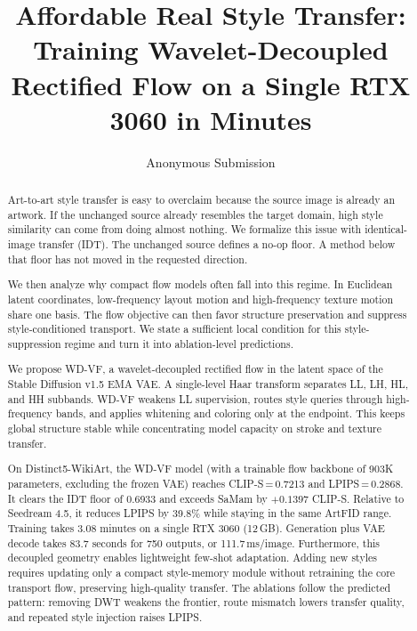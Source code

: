 \documentclass[letterpaper]{article}
\title{Affordable Real Style Transfer:\\Training Wavelet-Decoupled Rectified Flow on a Single RTX 3060 in Minutes}
\author{Anonymous Submission}
\begin{document}
\maketitle

\begin{abstract}
Art-to-art style transfer is easy to overclaim because the source image is already an artwork.
If the unchanged source already resembles the target domain, high style similarity can come from doing almost nothing.
We formalize this issue with identical-image transfer (IDT).
The unchanged source defines a no-op floor.
A method below that floor has not moved in the requested direction.

We then analyze why compact flow models often fall into this regime.
In Euclidean latent coordinates, low-frequency layout motion and high-frequency texture motion share one basis.
The flow objective can then favor structure preservation and suppress style-conditioned transport.
We state a sufficient local condition for this style-suppression regime and turn it into ablation-level predictions.

We propose \textnormal{WD-VF}, a wavelet-decoupled rectified flow in the latent space of the Stable Diffusion v1.5 EMA VAE.
A single-level Haar transform separates LL, LH, HL, and HH subbands.
WD-VF weakens LL supervision, routes style queries through high-frequency bands, and applies whitening and coloring only at the endpoint.
This keeps global structure stable while concentrating model capacity on stroke and texture transfer.

On Distinct5-WikiArt, the WD-VF model (with a trainable flow backbone of 903K parameters, excluding the frozen VAE) reaches CLIP-S\,=\,0.7213 and LPIPS\,=\,0.2868.
It clears the IDT floor of 0.6933 and exceeds SaMam by $+0.1397$ CLIP-S.
Relative to Seedream 4.5, it reduces LPIPS by 39.8\% while staying in the same ArtFID range.
Training takes 3.08 minutes on a single RTX 3060 (12\,GB).
Generation plus VAE decode takes 83.7 seconds for 750 outputs, or 111.7\,ms/image.
Furthermore, this decoupled geometry enables lightweight few-shot adaptation. Adding new styles requires updating only a compact style-memory module without retraining the core transport flow, preserving high-quality transfer.
The ablations follow the predicted pattern: removing DWT weakens the frontier, route mismatch lowers transfer quality, and repeated style injection raises LPIPS.
\end{abstract}
\end{document}
